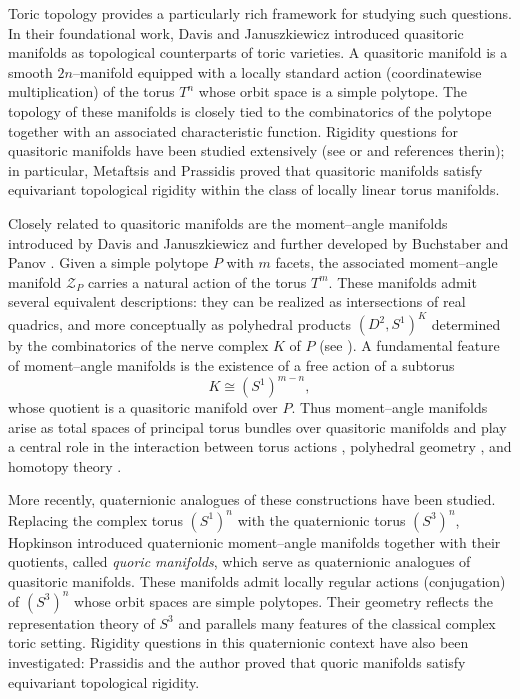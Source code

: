 \documentclass[11pt,a4paper]{article}
\numberwithin{equation}{section}
\theoremstyle{named}
\begin{document}
\medskip

Toric topology provides a particularly rich framework for studying such questions. In their foundational work, Davis and Januszkiewicz \cite{dj} introduced quasitoric manifolds as topological counterparts of toric varieties. A quasitoric manifold is a smooth $2n$--manifold equipped with a locally standard action (coordinatewise multiplication) of the torus $T^n$ whose orbit space is a simple polytope. The topology of these manifolds is closely tied to the combinatorics of the polytope together with an associated characteristic function. Rigidity questions for quasitoric manifolds have been studied extensively (see \cite{dav2}  or \cite{Wiemeler} and references therin); in particular, Metaftsis and Prassidis \cite{mp} proved that quasitoric manifolds satisfy equivariant topological rigidity within the class of locally linear torus manifolds.

\medskip

Closely related to quasitoric manifolds are the moment--angle manifolds introduced by Davis and Januszkiewicz \cite{dj} and further developed by Buchstaber and Panov \cite{bp}. Given a simple polytope $P$ with $m$ facets, the associated moment--angle manifold $\mathcal Z_P$ carries a natural action of the torus $T^m$. These manifolds admit several equivalent descriptions: they can be realized as intersections of real quadrics, and more conceptually as polyhedral products $(D^2,S^1)^K$ determined by the combinatorics of the nerve complex $K$ of $P$ (see \cite{bbcg,bp}). A fundamental feature of moment--angle manifolds is the existence of a free action of a subtorus
\[
K \cong (S^1)^{m-n},
\]
whose quotient is a quasitoric manifold over $P$. Thus moment--angle manifolds arise as total spaces of principal torus bundles over quasitoric manifolds and play a central role in the interaction between torus actions \cite{bp}, polyhedral geometry \cite{bbcg}, and homotopy theory \cite{gbricTheriault}.

\medskip

More recently, quaternionic analogues of these constructions have been studied. Replacing the complex torus $(S^1)^n$ with the quaternionic torus $(S^3)^n$, Hopkinson \cite{ho} introduced quaternionic moment--angle manifolds together with their quotients, called \emph{quoric manifolds}, which serve as quaternionic analogues of quasitoric manifolds. These manifolds admit locally regular actions (conjugation) of $(S^3)^n$ whose orbit spaces are simple polytopes. Their geometry reflects the representation theory of $S^3$ and parallels many features of the classical complex toric setting. Rigidity questions in this quaternionic context have also been investigated: Prassidis and the author \cite{gp} proved that quoric manifolds satisfy equivariant topological rigidity.
\end{document}
